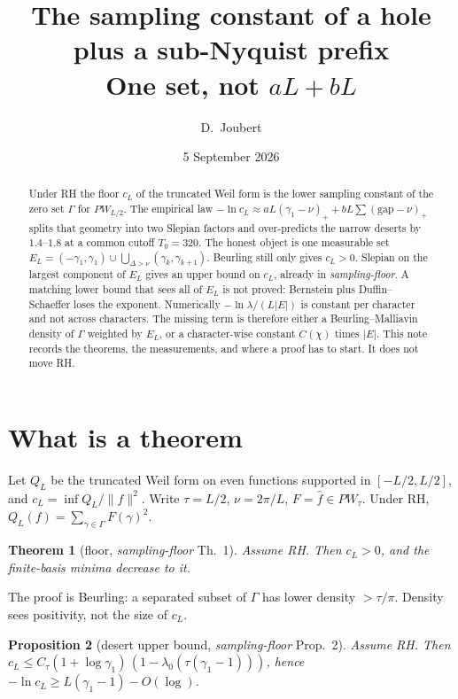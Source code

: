 \documentclass[11pt]{article}
\title{The sampling constant of a hole plus a sub-Nyquist prefix\\
\large One set, not $aL+bL$}
\author{D.\ Joubert}
\date{5 September 2026}
\newtheorem{theorem}{Theorem}
\newtheorem{proposition}[theorem]{Proposition}
\theoremstyle{remark}\newtheorem*{remark}{Remark}
\begin{document}
\maketitle
\begin{abstract}
Under RH the floor \(c_L\) of the truncated Weil form is the lower
sampling constant of the zero set \(\Gamma\) for \(PW_{L/2}\). The
empirical law \(-\ln c_L\approx aL(\gamma_1-\nu)_++bL\sum(\mathrm{gap}-\nu)_+\)
splits that geometry into two Slepian factors and over-predicts the
narrow deserts by \(1.4\)--\(1.8\) at a common cutoff \(T_0=320\).
The honest object is one measurable set
\(E_L=(-\gamma_1,\gamma_1)\cup\bigcup_{\Delta>\nu}(\gamma_k,\gamma_{k+1})\).
Beurling still only gives \(c_L>0\). Slepian on the largest component
of \(E_L\) gives an upper bound on \(c_L\), already in
\emph{sampling-floor}. A matching lower bound that sees all of \(E_L\)
is not proved: Bernstein plus Duffin--Schaeffer loses the exponent.
Numerically \(-\ln\lambda/(L|E|)\) is constant per character and not
across characters. The missing term is therefore either a
Beurling--Malliavin density of \(\Gamma\) weighted by \(E_L\), or a
character-wise constant \(C(\chi)\) times \(|E|\). This note records
the theorems, the measurements, and where a proof has to start. It
does not move RH.
\end{abstract}

\section{What is a theorem}

Let \(Q_L\) be the truncated Weil form on even functions supported in
\([-L/2,L/2]\), and \(c_L=\inf Q_L/\|f\|^2\). Write \(\tau=L/2\),
\(\nu=2\pi/L\), \(F=\hat f\in PW_\tau\). Under RH,
\(Q_L(f)=\sum_{\gamma\in\Gamma}F(\gamma)^2\).

\begin{theorem}[floor, \emph{sampling-floor} Th.~1]
Assume RH. Then \(c_L>0\), and the finite-basis minima decrease to it.
\end{theorem}

The proof is Beurling: a separated subset of \(\Gamma\) has lower
density \(>\tau/\pi\). Density sees positivity, not the size of \(c_L\).

\begin{proposition}[desert upper bound, \emph{sampling-floor} Prop.~2]
Assume RH. Then
\(c_L\le C_\tau(1+\log\gamma_1)\,(1-\lambda_0(\tau(\gamma_1-1)))\),
hence \(-\ln c_L\ge L(\gamma_1-1)-O(\log)\).
\end{proposition}
\end{document}
